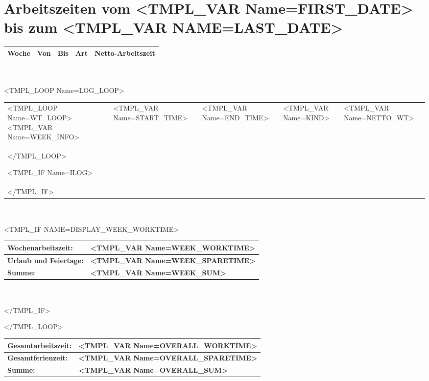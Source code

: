 \documentclass[11pt]{report}
\begin{document}
\setlength{\parindent}{0pt}
\setlength{\parindent}{0pt}
\setlength{\parskip}{1.5ex}



\section*{Arbeitszeiten vom <TMPL_VAR Name=FIRST_DATE> bis zum <TMPL_VAR NAME=LAST_DATE>}

\begin{tabular}{|p{4cm}|p{3.5cm}|p{3.5cm}|p{2cm}|p{2cm}|}
	\hline
	\textbf{Woche} & 
	\textbf{Von} & 
	\textbf{Bis} & 
	\textbf{Art} & 
	\textbf{Netto-Arbeitszeit} \\
	\hline
\end{tabular}
\\
\\

<TMPL_LOOP Name=LOG_LOOP>

\begin{tabular}{|p{4cm}|p{3.5cm}|p{3.5cm}|p{2cm}|p{2cm}|}
	\hline

	\hline
	<TMPL_LOOP Name=WT_LOOP>
         	<TMPL_VAR Name=WEEK_INFO> & 
	        <TMPL_VAR Name=START_TIME> & 
		<TMPL_VAR Name=END_TIME> & 
		<TMPL_VAR Name=KIND> & 
		<TMPL_VAR Name=NETTO_WT> \\
	</TMPL_LOOP> 

	<TMPL_IF Name=ILOG>
	
	\hline
	\multicolumn{5}{|l|}{ \parbox[b]{15cm}{ 

\small { \texttt{
<TMPL_VAR Name=ILOG> 
} }
 } } \\
	\hline
	</TMPL_IF>
	\hline
\end{tabular}
\\
\\
<TMPL_IF NAME=DISPLAY_WEEK_WORKTIME>
\begin{tabular}{|p{14.3cm}|p{2cm}|}
	\hline
	\textbf{Wochenarbeitszeit:} & 
	\textbf{<TMPL_VAR Name=WEEK_WORKTIME> } \\
	\hline
	\textbf{Urlaub und Feiertage:} & 
	\textbf{<TMPL_VAR Name=WEEK_SPARETIME> } \\
	\hline
	\textbf{Summe:} & 
	\textbf{<TMPL_VAR Name=WEEK_SUM> } \\
	\hline
\end{tabular}
\\
\\
</TMPL_IF>

</TMPL_LOOP>

\begin{tabular}{|p{14.3cm}|p{2cm}|}
	\hline
	\textbf{Gesamtarbeitszeit:} & 
	\textbf{<TMPL_VAR Name=OVERALL_WORKTIME> } \\
	\hline
	\textbf{Gesamtferienzeit:} & 
	\textbf{<TMPL_VAR Name=OVERALL_SPARETIME> } \\
	\hline
	\textbf{Summe:} & 
	\textbf{<TMPL_VAR Name=OVERALL_SUM> } \\
	\hline
\end{tabular}
\end{document}
